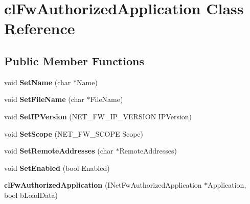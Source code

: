 \hypertarget{classcl_fw_authorized_application}{
\section{clFwAuthorizedApplication Class Reference}
\label{classcl_fw_authorized_application}
}
\subsection*{Public Member Functions}
\begin{DoxyCompactItemize}
\item 
\hypertarget{classcl_fw_authorized_application_a9ac38108d14e6286d947247641566237}{
void {\bfseries SetName} (char $\ast$Name)}
\label{classcl_fw_authorized_application_a9ac38108d14e6286d947247641566237}

\item 
\hypertarget{classcl_fw_authorized_application_a7bd9d6a38447487b48a149b908de28e2}{
void {\bfseries SetFileName} (char $\ast$FileName)}
\label{classcl_fw_authorized_application_a7bd9d6a38447487b48a149b908de28e2}

\item 
\hypertarget{classcl_fw_authorized_application_acc39dc4a10adace5ba16d809a672f7f7}{
void {\bfseries SetIPVersion} (NET\_\-FW\_\-IP\_\-VERSION IPVersion)}
\label{classcl_fw_authorized_application_acc39dc4a10adace5ba16d809a672f7f7}

\item 
\hypertarget{classcl_fw_authorized_application_a0c3a60e6078bd81032fe850ae05bd155}{
void {\bfseries SetScope} (NET\_\-FW\_\-SCOPE Scope)}
\label{classcl_fw_authorized_application_a0c3a60e6078bd81032fe850ae05bd155}

\item 
\hypertarget{classcl_fw_authorized_application_a1f348dcf3497c86cd28a94b004d36975}{
void {\bfseries SetRemoteAddresses} (char $\ast$RemoteAddresses)}
\label{classcl_fw_authorized_application_a1f348dcf3497c86cd28a94b004d36975}

\item 
\hypertarget{classcl_fw_authorized_application_ace0a7710068102bce0f3955c46af527b}{
void {\bfseries SetEnabled} (bool Enabled)}
\label{classcl_fw_authorized_application_ace0a7710068102bce0f3955c46af527b}

\item 
\hypertarget{classcl_fw_authorized_application_a776282c4700e8adeaede5a7d3c282b87}{
{\bfseries clFwAuthorizedApplication} (INetFwAuthorizedApplication $\ast$Application, bool bLoadData)}
\label{classcl_fw_authorized_application_a776282c4700e8adeaede5a7d3c282b87}


\end{DoxyCompactItemize}
